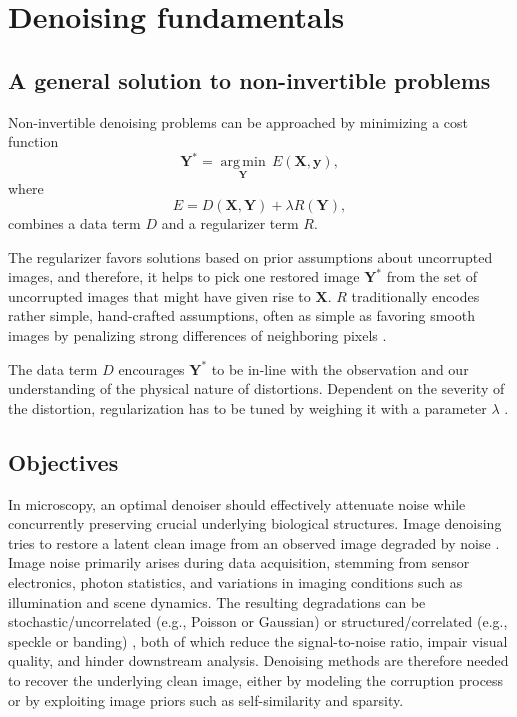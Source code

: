\chapter{Denoising fundamentals}

\section{A general solution to non-invertible problems}

Non-invertible denoising problems can be approached by minimizing a
cost function
\begin{equation}
\mathbf{Y}^*=\underset{\mathbf{Y}}{\operatorname{arg\,min}} \, E(\mathbf{X},\mathbf{y}),
\end{equation}
where
\begin{equation}
E = D(\mathbf{X},\mathbf{Y}) + \lambda R(\mathbf{Y}),
\end{equation}
combines a data term $D$ and a regularizer term $R$.

The regularizer favors solutions based on prior assumptions about
uncorrupted images, and therefore, it helps to pick one restored image
$\mathbf{Y}^*$ from the set of uncorrupted images that might have
given rise to $\mathbf{X}$. $R$ traditionally encodes rather simple,
hand-crafted assumptions, often as simple as favoring smooth images by
penalizing strong differences of neighboring pixels
\cite{buchholz2019content}.

The data term $D$ encourages $\mathbf{Y}^*$ to be in-line with the
observation and our understanding of the physical nature of
distortions. Dependent on the severity of the distortion,
regularization has to be tuned by weighing it with a parameter
$\lambda$ \cite{buchholz2019content}.


\section{Objectives}

In microscopy, an optimal denoiser should effectively attenuate noise
while concurrently preserving crucial underlying biological
structures. Image denoising tries to restore a latent clean image from
an observed image degraded by noise \cite{BUCHHOLZ2019277}. Image
noise primarily arises during data acquisition, stemming from sensor
electronics, photon statistics, and variations in imaging conditions
such as illumination and scene dynamics. The resulting degradations
can be stochastic/uncorrelated (e.g., Poisson or Gaussian) or
structured/correlated (e.g., speckle or banding)
\cite{wang2025median2median}, both of which reduce the signal-to-noise
ratio, impair visual quality, and hinder downstream
analysis. Denoising methods are therefore needed to recover the
underlying clean image, either by modeling the corruption process or
by exploiting image priors such as self-similarity and sparsity.

